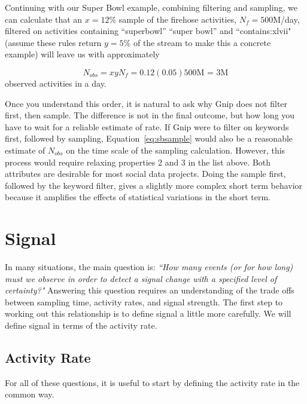 \documentclass{article}
\begin{document}
Continuing with our Super Bowl example, combining filtering and sampling, we can calculate that an $x=12\%$ sample of the firehose activities, $N_f=500$M/day, filtered on activities containing ``superbowl'' ``super bowl'' and ``contains:xlvii" (assume these rules return $y=5\%$ of the stream to make this a concrete example) will leave us with approximately

\begin{equation}
    \label{eq:sbsample}
    N_{obs} = x y N_f = 0.12 (0.05) 500 \textrm{M = 3M}
\end{equation}
observed activities in a day. 

Once you understand this order, it is natural to ask why Gnip does not filter first, then sample. The difference is not in the final outcome, but how long you have to wait for a reliable estimate of rate. If Gnip were to filter on keywords first, followed by sampling, Equation~\ref{eq:sbsample} would also be a reasonable estimate of $N_{obs}$ on the time scale of the sampling calculation. However, this process would require relaxing properties 2 and 3 in the list above. Both attributes are desirable for most social data projects. Doing the sample first, followed by the keyword filter, gives a slightly more complex short term behavior because it amplifies the effects of statistical variations in the short term.

\section{Signal} 

In many situations, the main question is: \emph{``How many events (or for how long) must we observe in order to detect a signal change with a specified level of certainty?"} Answering this question requires an understanding of the trade offs between sampling time, activity rates, and signal strength.  The first step to working out this relationship is to define signal a little more carefully. We will define signal in terms of the activity rate.

\subsection{Activity Rate} 

For all of these questions, it is useful to start by defining the activity rate in the common way.
\end{document}
